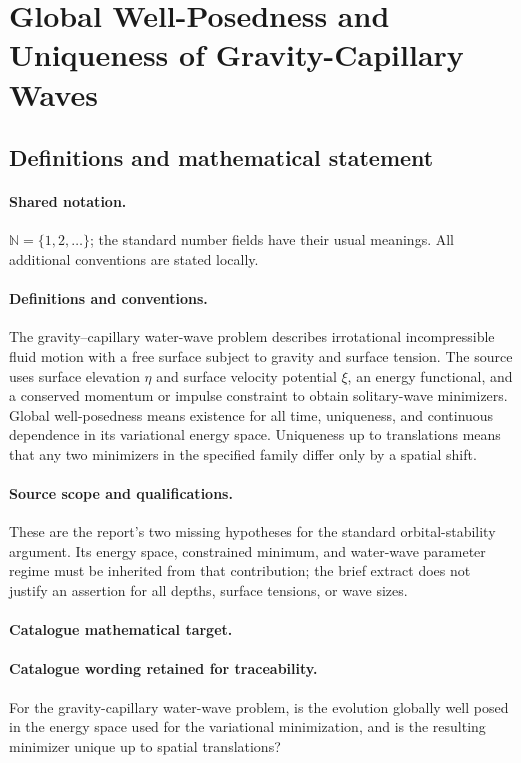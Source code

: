 \documentclass[11pt]{article}
\begin{document}
\section{Global Well-Posedness and Uniqueness of Gravity-Capillary Waves}\label{statement}

\subsection{Definitions and mathematical statement}

\paragraph{Shared notation.}$\mathbb N=\{1,2,\ldots\}$; the standard number fields have their usual meanings. All additional conventions are stated locally.


\paragraph{Definitions and conventions.} The gravity--capillary water-wave problem describes irrotational incompressible fluid motion with a free surface subject to gravity and surface tension. The source uses surface elevation $\eta$ and surface velocity potential $\xi$, an energy functional, and a conserved momentum or impulse constraint to obtain solitary-wave minimizers. Global well-posedness means existence for all time, uniqueness, and continuous dependence in its variational energy space. Uniqueness up to translations means that any two minimizers in the specified family differ only by a spatial shift.

\paragraph{Source scope and qualifications.} These are the report's two missing hypotheses for the standard orbital-stability argument. Its energy space, constrained minimum, and water-wave parameter regime must be inherited from that contribution; the brief extract does not justify an assertion for all depths, surface tensions, or wave sizes.

\paragraph{Catalogue mathematical target.}
\paragraph{Catalogue wording retained for traceability.}
For the gravity-capillary water-wave problem, is the evolution globally well posed in the energy space used for the variational minimization, and is the resulting minimizer unique up to spatial translations?
\end{document}

